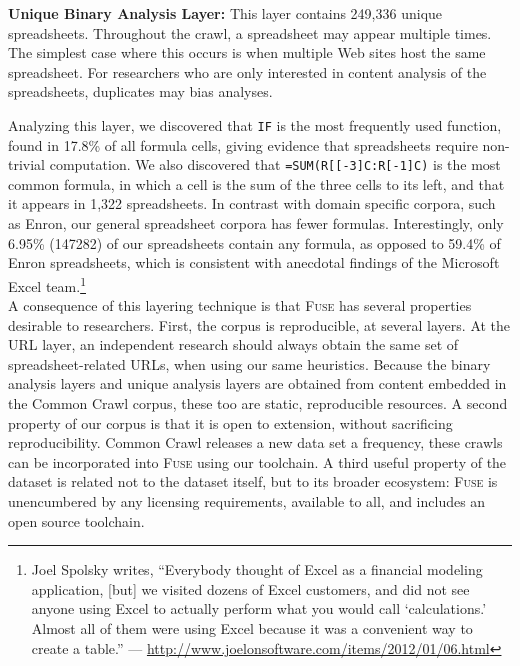 \documentclass[conference]{IEEEtran}
\begin{document}

\textbf{Unique Binary Analysis Layer:}  This layer contains 249,336 unique spreadsheets.  Throughout the crawl, a spreadsheet may appear multiple times. The simplest case where this occurs is when multiple Web sites host the same spreadsheet. For researchers who are only interested in content analysis of the spreadsheets, duplicates may bias analyses. 

Analyzing this layer, we discovered that \texttt{IF} is the most frequently used function, found in 17.8\% of all formula cells, giving evidence that spreadsheets require non-trivial computation. We also discovered that \texttt{=SUM(R[[-3]C:R[-1]C)} is the most common formula, in which a cell is the sum of the three cells to its left, and that it appears in 1,322 spreadsheets. In contrast with domain specific corpora, such as Enron, our general spreadsheet corpora has fewer formulas. Interestingly, only 6.95\% (147282) of our spreadsheets contain any formula, as opposed to 59.4\% of Enron spreadsheets, which is consistent with anecdotal findings of the Microsoft Excel team.\footnote{Joel Spolsky writes, ``Everybody thought of Excel as a financial modeling application, [but] we visited dozens of Excel customers, and did not see anyone using Excel to actually perform what you would call `calculations.' Almost all of them were using Excel because it was a convenient way to create a table.'' --- \url{http://www.joelonsoftware.com/items/2012/01/06.html}}\\




A consequence of this layering technique is that \textsc{Fuse} has several properties desirable to researchers. First, the corpus is reproducible, at several layers. 
At the URL layer, an independent research should always obtain the same set of spreadsheet-related URLs, when using our same heuristics. %
Because the binary analysis layers and unique analysis layers are obtained from content embedded in the Common Crawl corpus, these too are static, reproducible resources. A second property of our corpus is that it is open to extension, without sacrificing reproducibility. Common Crawl releases a new data set a frequency, these crawls can be incorporated into \textsc{Fuse} using our toolchain. A third useful property of the dataset is related not to the dataset itself, but to its broader ecosystem: \textsc{Fuse} is unencumbered by any licensing requirements, available to all, and includes an open source toolchain.
\end{document}
